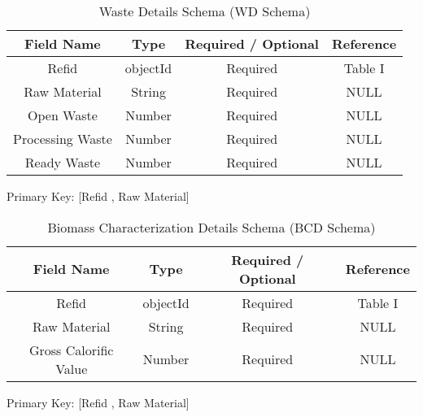 \documentclass[conference]{IEEEtran}
\begin{document}
\begin{table}[htbp]
\caption{Waste Details Schema (WD Schema)}
\centering
\begin{tabular}{|c|c|c|c|} 
\hline
\textbf{Field Name} & \textbf{Type}& \textbf{Required / Optional} & \textbf{Reference} \\
\hline
Refid & objectId & Required & Table I \\
\hline
Raw Material & String & Required & NULL \\
\hline
Open Waste & Number & Required & NULL\\
\hline
Processing Waste & Number & Required & NULL\\
\hline
Ready Waste & Number & Required & NULL\\
\hline
\end{tabular}
\label{table5}
\begin{center}
Primary Key: [Refid , Raw Material]
\end{center}
\end{table}
\raggedbottom

\begin{table}[htbp]
\caption{Biomass Characterization Details Schema (BCD Schema)}
\centering
\begin{tabular}{|c|c|c|c|} 
\hline
\textbf{Field Name} & \textbf{Type}& \textbf{Required / Optional} & \textbf{Reference} \\
\hline
Refid & objectId & Required & Table I \\
\hline
Raw Material & String & Required & NULL \\
\hline
Gross Calorific Value & Number & Required & NULL\\
\hline
\end{tabular}
\label{table6}
\begin{center}
Primary Key: [Refid , Raw Material]
\end{center}
\end{table}
\raggedbottom
\end{document}
